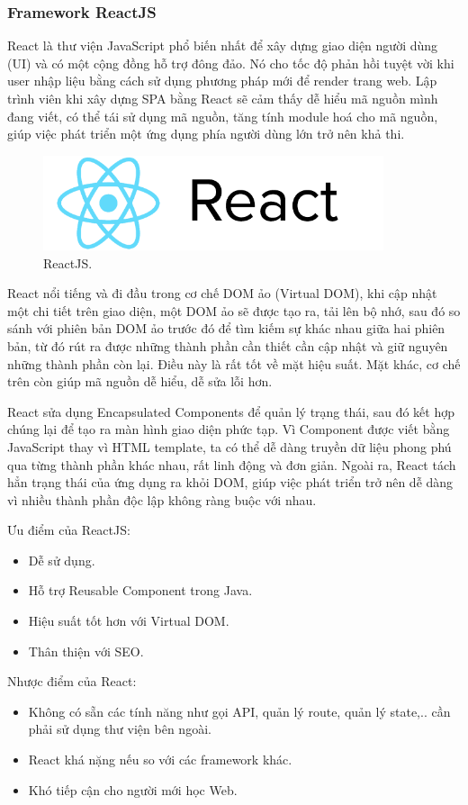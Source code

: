 \subsubsection{Framework ReactJS}
React là thư viện JavaScript phổ biến nhất để xây dựng giao diện người dùng (UI) và có một cộng đồng hỗ trợ đông
đảo. Nó cho tốc độ phản hồi tuyệt vời khi user nhập liệu bằng cách sử dụng phương pháp mới để render trang web. Lập trình viên khi xây dựng SPA bằng React sẽ cảm thấy dễ hiểu mã nguồn mình đang viết, có thể tái sử dụng mã nguồn, tăng tính module hoá cho mã nguồn, giúp việc phát triển một ứng dụng phía người dùng lớn trở nên khả thi. \par
\begin{figure}[h!]
    \begin{center}
        \includegraphics[width=10cm]{Image/Technical/react_logo.png}
        \caption{ReactJS.}
        \label{reactjs}
    \end{center}
\end{figure}
React nổi tiếng và đi đầu trong cơ chế DOM ảo (Virtual DOM), khi cập nhật một chi tiết trên giao diện, một DOM ảo sẽ được tạo ra, tải lên bộ nhớ, sau đó so sánh với phiên bản DOM ảo trước đó để tìm kiếm sự khác nhau giữa hai phiên bản, từ đó rút ra được những thành phần cần thiết cần cập nhật và giữ nguyên những thành phần còn lại. Điều này là rất tốt về mặt hiệu suất. Mặt khác, cơ chế trên còn giúp mã nguồn dễ hiểu, dễ sửa lỗi hơn. \par
React sửa dụng Encapsulated Components để quản lý trạng thái, sau đó kết hợp chúng lại để tạo ra màn hình giao diện phức tạp. Vì Component được viết bằng JavaScript thay vì HTML template, ta có thể dễ dàng truyền dữ liệu phong phú qua từng thành phần khác nhau, rất linh động và đơn giản. Ngoài ra, React tách hẳn trạng thái của ứng dụng ra khỏi DOM, giúp việc phát triển trở nên dễ dàng vì nhiều thành phần độc lập không ràng buộc với nhau.\par
Ưu điểm của ReactJS:
\begin{itemize}
    \item Dễ sử dụng.
    \item Hỗ trợ Reusable Component trong Java.
    \item Hiệu suất tốt hơn với Virtual DOM.
    \item Thân thiện với SEO.
\end{itemize}
Nhược điểm của React:
\begin{itemize}
    \item Không có sẵn các tính năng như gọi API, quản lý route, quản lý state,.. cần phải sử dụng thư viện bên ngoài.
    \item React khá nặng nếu so với các framework khác.
    \item Khó tiếp cận cho người mới học Web.
\end{itemize}
